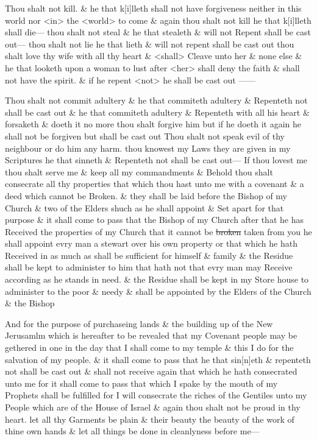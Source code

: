 				Thou shalt not kill. \& he that k[i]lleth shall not have forgiveness neither in this world nor <in> the <world> to come \& again thou shalt not kill he that k[i]lleth shall die--- thou shalt not steal \& he that stealeth \& will not Repent shall be cast out--- thou shalt not lie he that lieth \& will not repent shall be cast out thou shalt love thy wife with all thy heart \& <shall> Cleave unto her \& none else \& he that looketh upon a woman to lust after <her> shall deny the faith \& shall not have the spirit. \& if he repent <not> he shall be cast out ------

				Thou shalt not commit adultery \& he that commiteth adultery \& Repenteth not shall be cast out \& he that commiteth adultery \& Repenteth with all his heart \& forsaketh \& doeth it no more thou shalt forgive him but if he doeth it again he shall not be forgiven but shall be cast out Thou shalt not speak evil of thy neighbour or do him any harm. thou knowest my Laws they are given in my Scriptures he that sinneth \& Repenteth not shall be cast out--- If thou lovest me thou shalt serve me \& keep all my commandments \& Behold thou shalt consecrate all thy properties that which thou hast unto me with a covenant \& a deed which cannot be Broken. \& they shall be laid before the Bishop of my Church \& two of the Elders shuch as he shall appoint \& Set apart for that purpose \& it shall come to pass that the Bishop of my Church after that he has Received the properties of my Church that it cannot be \sout{broken} taken from you he shall appoint evry man a stewart over his own property or that which he hath Received in as much as shall be sufficient for himself \& family \& the Residue shall be kept to administer to him that hath not that evry man may Receive according as he stands in need. \& the Residue shall be kept in my Store house to administer to the poor \& needy \& shall be appointed by the Elders of the Church \& the Bishop

				And for the purpose of purchaseing lands \& the building up of the New Jerusamlm which is hereafter to be revealed that my Covenant people may be gethered in one in the day that I shall come to my temple \& this I do for the salvation of my people. \& it shall come to pass that he that sin[n]eth \& repenteth not shall be cast out \& shall not receive again that which he hath consecrated unto me for it shall come to pass that which I spake by the mouth of my Prophets shall be fulfilled for I will consecrate the riches of the Gentiles unto my People which are of the House of Israel \& again thou shalt not be proud in thy heart. let all thy Garments be plain \& their beauty the beauty of the work of thine own hands \& let all things be done in cleanlyness before me---


